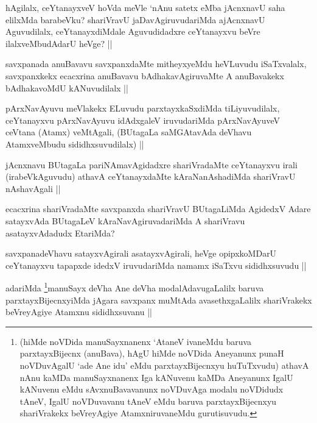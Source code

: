 \begin{artha}
hAgilalx, ceYtanayxveV hoVda meVle `nAnu satetx eMba jAcnxnavU saha elilxMda barabeVku? shariVravU jaDavAgiruvudariMda ajAcnxnavU Aguvudilalx, ceYtanayxdiMdale Aguvudidadxre ceYtanayxvu beVre ilalxveMbudAdarU heVge? ||
\end{artha}

\begin{artha}
savxpanada anuBavavu savxpanxdaMte mitheyxyeMdu heVLuvudu iSaTxvalalx, savxpanxkekx ecacxrina anuBavavu bAdhakavAgiruvaMte A anuBavakekx bAdhakavoMdU kANuvudilalx ||
\end{artha}

\begin{artha}
pArxNavAyuvu meVlakekx ELuvudu parxtayxkaSxdiMda tiLiyuvudilalx, ceYtanayxvu pArxNavAyuvu idAdxgaleV iruvudariMda pArxNavAyuveV ceVtana (Atamx) veMtAgali, (BUtagaLa saMGAtavAda deVhavu AtamxveMbudu sididhxsuvudilalx) ||
\end{artha}

\begin{artha}
jAcnxnavu BUtagaLa pariNAmavAgidadxre shariVradaMte ceYtanayxvu irali (irabeVkAguvudu) athavA ceYtanayxdaMte kAraNanAshadiMda shariVravU nAshavAgali ||
\end{artha}

\begin{artha}
ecacxrina shariVradaMte savxpanxda shariVravU BUtagaLiMda AgidedxV Adare satayxvAda BUtagaLeV kAraNavAgiruvadariMda A shariVravu asatayxvAdadudx EtariMda?
\end{artha}

\begin{artha}
savxpanadeVhavu satayxvAgirali asatayxvAgirali, heVge opipxkoMDarU ceYtanayxvu tapapxde idedxV iruvudariMda namamx iSaTxvu sididhxsuvudu ||
\end{artha}

\begin{artha}
adariMda \footnote{(hiMde noVDida manuSayxnanenx `AtaneV ivaneMdu baruva parxtayxBijecnx (anuBava), hAgU hiMde noVDida Aneyanunx punaH noVDuvAgalU `ade Ane idu' eMdu parxtayxBijecnxyu huTuTxvudu) athavA nAnu kaMDa manuSayxnanenx Iga kANuvenu kaMDa Aneyanunx IgalU kANuvenu eMdu sAvxnuBavavanunx  noVDuvAga modalu noVDidudx tAneV, IgalU noVDuvavanu tAneV eMdu baruva parxtayxBijecnxyu shariVrakekx beVreyAgiye AtamxniruvaneMdu gurutisuvudu.}manuSayx deVha Ane deVha modalAdavugaLalilx baruva parxtayxBijecnxyiMda jAgara savxpanx muMtAda avasethxgaLalilx shariVrakekx beVreyAgiye Atamxnu sididhxsuvanu ||
\end{artha}

